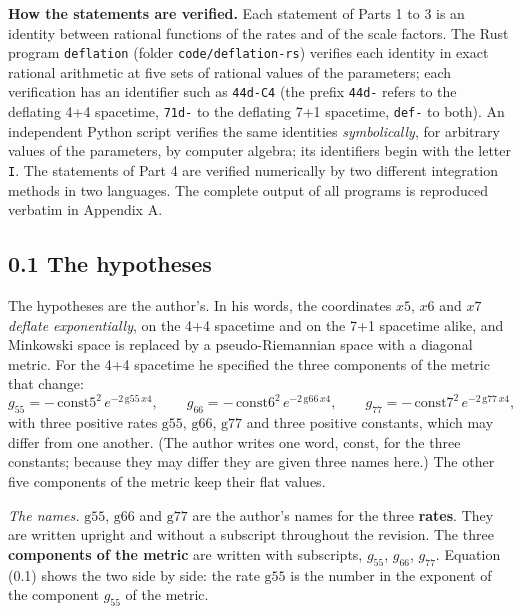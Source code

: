 \documentclass[
  10pt,
]{article}
\begin{document}
\textbf{How the statements are verified.} Each statement of Parts 1 to 3
is an identity between rational functions of the rates and of the scale
factors. The Rust program \texttt{deflation} (folder
\texttt{code/deflation-rs}) verifies each identity in exact rational
arithmetic at five sets of rational values of the parameters; each
verification has an identifier such as \texttt{44d-C4} (the prefix
\texttt{44d-} refers to the deflating 4+4 spacetime, \texttt{71d-} to
the deflating 7+1 spacetime, \texttt{def-} to both). An independent
Python script verifies the same identities \emph{symbolically}, for
arbitrary values of the parameters, by computer algebra; its identifiers
begin with the letter \texttt{I}. The statements of Part 4 are verified
numerically by two different integration methods in two languages. The
complete output of all programs is reproduced verbatim in Appendix A.

\hypertarget{the-hypotheses}{%
\subsection{0.1 The hypotheses}\label{the-hypotheses}}

The hypotheses are the author's. In his words, the coordinates \(x5\),
\(x6\) and \(x7\) \emph{deflate exponentially}, on the 4+4 spacetime and
on the 7+1 spacetime alike, and Minkowski space is replaced by a
pseudo-Riemannian space with a diagonal metric. For the 4+4 spacetime he
specified the three components of the metric that change:
\[g_{55}=-\,\mathrm{const5}^2\,e^{-2\,\mathrm{g55}\,x4},\qquad
g_{66}=-\,\mathrm{const6}^2\,e^{-2\,\mathrm{g66}\,x4},\qquad
g_{77}=-\,\mathrm{const7}^2\,e^{-2\,\mathrm{g77}\,x4},\tag{0.1}\] with
three positive rates \(\mathrm{g55}\), \(\mathrm{g66}\),
\(\mathrm{g77}\) and three positive constants, which may differ from one
another. (The author writes one word, const, for the three constants;
because they may differ they are given three names here.) The other five
components of the metric keep their flat values.

\emph{The names.} \(\mathrm{g55}\), \(\mathrm{g66}\) and
\(\mathrm{g77}\) are the author's names for the three \textbf{rates}.
They are written upright and without a subscript throughout the
revision. The three \textbf{components of the metric} are written with
subscripts, \(g_{55}\), \(g_{66}\), \(g_{77}\). Equation (0.1) shows the
two side by side: the rate \(\mathrm{g55}\) is the number in the
exponent of the component \(g_{55}\) of the metric.
\end{document}
